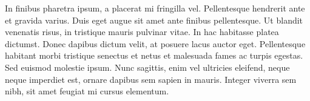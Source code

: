\documentclass{article}
\begin{document}
In finibus pharetra ipsum, a placerat mi fringilla vel. Pellentesque hendrerit ante et gravida varius. Duis eget augue sit amet ante finibus pellentesque. Ut blandit venenatis risus, in tristique mauris pulvinar vitae. In hac habitasse platea dictumst. Donec dapibus dictum velit, at posuere lacus auctor eget. Pellentesque habitant morbi tristique senectus et netus et malesuada fames ac turpis egestas. Sed euismod molestie ipsum. Nunc sagittis, enim vel ultricies eleifend, neque neque imperdiet est, ornare dapibus sem sapien in mauris. Integer viverra sem nibh, sit amet feugiat mi cursus elementum.





\printbibliography[title={Bibliography}]
\end{document}
